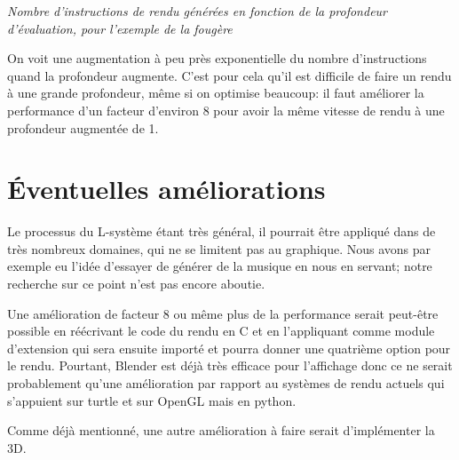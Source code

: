 \documentclass[a4paper]{article}
\begin{document}
{\centering\emph{Nombre d'instructions de rendu générées en fonction de la profondeur d'évaluation, pour l'exemple de la fougère}}

On voit une augmentation à peu près exponentielle du nombre d'instructions quand la profondeur augmente. C'est pour cela qu'il est difficile de faire un rendu à une grande profondeur, même si on optimise beaucoup: il faut améliorer la performance d'un facteur d'environ 8 pour avoir la même vitesse de rendu à une profondeur augmentée de 1. 

\section{Éventuelles améliorations}
Le processus du L-système étant très général, il pourrait être appliqué dans de très nombreux domaines, qui ne se limitent pas au graphique. Nous avons par exemple eu l'idée d'essayer de générer de la musique en nous en servant; notre recherche sur ce point n'est pas encore aboutie.

Une amélioration de facteur 8 ou même plus de la performance serait peut-être possible en réécrivant le code du rendu en C et en l'appliquant comme module d'extension qui sera ensuite importé et pourra donner une quatrième option pour le rendu. Pourtant, Blender est déjà très efficace pour l'affichage donc ce ne serait probablement qu'une amélioration par rapport au systèmes de rendu actuels qui s'appuient sur turtle et sur OpenGL mais en python.

Comme déjà mentionné, une autre amélioration à faire serait d'implémenter la 3D.
\end{document}
